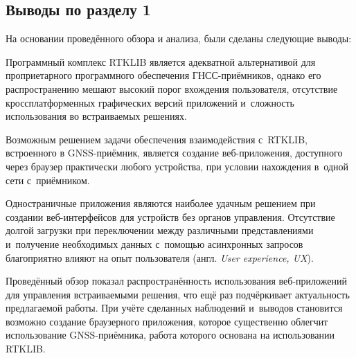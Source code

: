 \subsection{Выводы по разделу 1}
\label{subsec:section1-conclusions}

На основании проведённого обзора и анализа, были сделаны следующие выводы:

\begin{dashitemize}
  \item Программный комплекс RTKLIB является адекватной альтернативой для проприетарного программного обеспечения ГНСС-приёмников, однако его распространению мешают высокий порог вхождения пользователя, отсутствие кроссплатформенных графических версий приложений и~сложность использования во встраиваемых решениях.
  \item Возможным решением задачи обеспечения взаимодействия с~RTKLIB, встроенного в GNSS-приёмник, является создание веб-приложения, доступного через браузер практически любого устройства, при условии нахождения в~одной сети с~приёмником.
  \item Одностраничные приложения являются наиболее удачным решением при создании веб-интерфейсов для устройств без органов управления. Отсутствие долгой загрузки при переключении между различными представлениями и~получение необходимых данных с~помощью асинхронных запросов благоприятно влияют на опыт пользователя (англ. \emph{User experience, UX}).
\end{dashitemize}

Проведённый обзор показал распространённость использования веб-приложений для управления встраиваемыми решения, что ещё раз подчёркивает актуальность предлагаемой работы. При учёте сделанных наблюдений и~выводов становится возможно создание браузерного приложения, которое существенно облегчит использование GNSS-приёмника, работа которого основана на использовании RTKLIB.

\newpage
